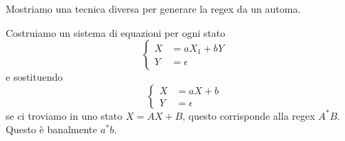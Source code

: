 \documentclass[12pt]{article}
\begin{document}
\begin{tcolorbox}
	Mostriamo una tecnica diversa per generare la regex da un automa.
	\begin{center}
	\end{center}
	Costruiamo un sistema di equazioni per ogni stato
	$$
	\begin{cases}
		X &= a X_1 + b Y \\
		Y &= \epsilon
	\end{cases}
	$$
	e sostituendo 
	$$
	\begin{cases}
		X &= a X + b  \\
		Y &= \epsilon
	\end{cases}
	$$
	se ci troviamo in uno stato $X = A X + B$, questo corrisponde alla regex $A^* B$.
	Questo è banalmente $a^*b$.
\end{tcolorbox}
\end{document}
